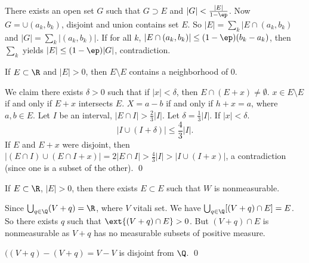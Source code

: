 \pf There exists an open set $G$ such that $G \supset E$ and $|G|< \frac{|E|}{1-\ep}$. Now $G= \cup (a_k,b_k)$, disjoint and union contains set $E$. So $|E|= \sum_k |E \cap (a_k,b_k)$ and $|G|= \sum_k |(a_k,b_k)|$. If for all $k$, $| E \cap (a_k,b_k)| \leq (1- \ep)(b_k-a_k)$, then $\sum_k$ yields $|E| \leq (1-\ep)|G|$, contradiction. 



\begin{lem} \label{lem:subzero}
If $E \subset \R$ and $|E|>0$, then $E \setminus E$ contains a neighborhood of 0. 
\end{lem}



\pf We claim there exists $\delta>0$ such that if $|x|<\delta$, then $E \cap (E+x) \neq \emptyset$. $x \in E \setminus E$ if and only if $E+x$ intersects $E$. $X= a-b$ if and only if $h+x=a$, where $a,b \in E$. Let $I$ be an interval, $|E \cap I|> \frac{2}{3} |I|$. Let $\delta= \frac{1}{3} |I|$. If $|x|<\delta$.
	\[
	|I \cup (I+\delta)| \leq \frac{4}{3} |I|. 
	\]
If $E$ and $E+x$ were disjoint, then $| (E \cap I) \cup (E \cap I +x)|= 2|E \cap I|> \frac{4}{3} |I|> |I \cup (I+x)|$, a contradiction (since one is a subset of the other). \qed \\



\begin{thm}
If $E \subset \R$, $|E|>0$, then there exists $E \subset E$ such that $W$ is nonmeasurable. 
\end{thm}

\pf Since $\bigcup_{q \in \Q} (V+q)=\R$, where $V$ vitali set. We have $\bigcup_{q \in \Q} [(V+q) \cap E]=E$. So there exists $q$ such that $\ext{(V+q) \cap E} >0$. But $(V+q) \cap E$ is nonmeasurable as $V+q$ has no measurable subsets of positive measure. 

$((V+q)-(V+q)= V-V$ is disjoint from $\Q$. \qed \\














